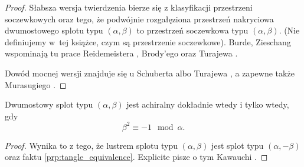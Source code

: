 \begin{proof}
    Słabsza wersja twierdzenia bierze się z klasyfikacji przestrzeni soczewkowych oraz tego, że podwójnie rozgałęziona przestrzeń nakryciowa dwumostowego splotu typu $(\alpha, \beta)$ to przestrzeń soczewkowa typu $(\alpha, \beta)$.
    (Nie definiujemy w~tej książce, czym są przestrzenie soczewkowe).
%
    Burde, Zieschang \cite[s. 212]{burde14} wspominają tu prace Reidemeistera \cite{reidemeisterXX}, Brody'ego \cite{brodyXX} oraz Turajewa \cite{turaevXX}.

    Dowód mocnej wersji znajduje się u Schuberta \cite{schubert56} albo Turajewa \cite{turaevXX}, a zapewne także Murasugiego \cite[s. ?]{murasugi96}.
\end{proof}

\begin{proposition}
    Dwumostowy splot typu $(\alpha, \beta)$ jest achiralny dokładnie wtedy i tylko wtedy, gdy
    \begin{equation}
        \beta^2 \equiv -1 \mod \alpha.
    \end{equation}
\end{proposition}

\begin{proof}
    Wynika to z tego, że lustrem splotu typu $(\alpha, \beta)$ jest splot typu $(\alpha, -\beta)$ oraz faktu \ref{prp:tangle_equivalence}.
    Explicite pisze o tym Kawauchi \cite[s. 24]{kawauchi96}.
\end{proof}

